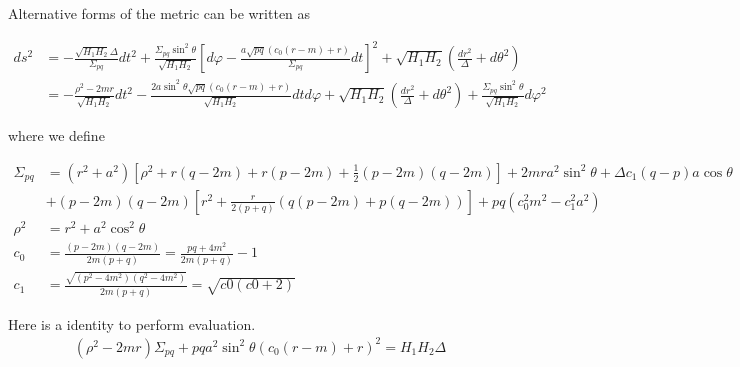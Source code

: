 \documentclass[%
 reprint,
 amsmath,amssymb,
 aps,
]{revtex4-1}
\begin{document}
Alternative forms of the metric can be written as
\begin{widetext}
\begin{align}
ds^2 &= -\frac{\sqrt{H_1 H_2} \Delta}{\Sigma_{pq}} dt^2 + \frac{\Sigma_{pq} \sin^2 \theta}{\sqrt{H_1 H_2}} \left[d\varphi - \frac{a \sqrt{pq} (c_0 (r-m) +r)}{\Sigma_{pq}} dt \right]^2 + \sqrt{H_1 H_2} \left(\frac{dr^2}{\Delta} + d\theta^2 \right) \\
        &=-\frac{\rho^2 - 2mr}{\sqrt{H_1 H_2}} dt^2 - \frac{2a \sin^2 \theta \sqrt{pq} (c_0(r-m) +r)}{\sqrt{H_1 H_2}} dt d\varphi + \sqrt{H_1 H_2} \left( \frac{dr^2}{\Delta} + d\theta^2 \right) + \frac{\Sigma_{pq} \sin^2 \theta}{\sqrt{H_1 H_2}} d\varphi^2
\end{align}
\end{widetext}
where we define
\begin{widetext}
\begin{align}
\Sigma_{pq} &= (r^2 + a^2) \left[\rho^2 + r(q-2m) + r(p-2m) + \frac{1}{2} (p-2m)(q-2m) \right] + 2mra^2 \sin^2 \theta + \Delta c_1 (q-p) a \cos \theta \nonumber \\
                    &+ (p-2m)(q-2m) \left[r^2 + \frac{r}{2(p+q)} (q(p-2m) + p(q-2m)) \right] + pq (c_0^2 m^2 - c_1^2 a^2)\\
\rho^2 &= r^2 + a^2 \cos^2 \theta \\
c_0 &= \frac{(p-2m)(q-2m)}{2m(p+q)} = \frac{pq +4m^2}{2m(p+q)} - 1 \\
c_1 &=\frac{\sqrt{(p^2 - 4m^2)(q^2 - 4m^2)}}{2m(p+q)} = \sqrt{c0 (c0+2)} 
\end{align}
\end{widetext}
Here is a identity to perform evaluation.
\begin{align}
(\rho^2 - 2mr) \Sigma_{pq} + pq a^2 \sin^2 \theta(c_0 (r-m) +r)^2 = H_1 H_2 \Delta
\end{align}
\end{document}
